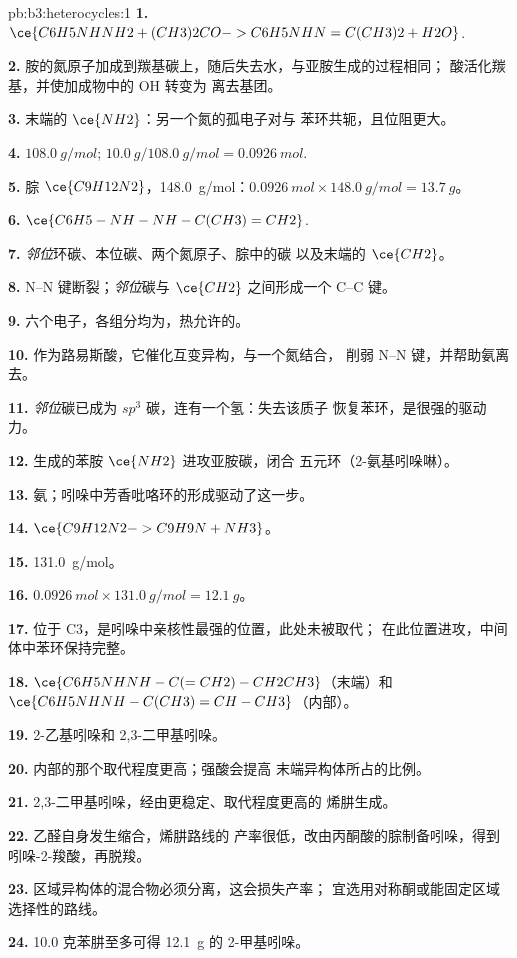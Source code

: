 \begin{solution}{pb:b3:heterocycles:1}
\textbf{1.} $\ce{C6H5NHNH2 + (CH3)2CO -> C6H5NHN=C(CH3)2 + H2O}$.

\textbf{2.} 胺的氮原子加成到羰基碳上，随后失去水，与亚胺生成的过程相同；
酸活化羰基，并使加成物中的 OH 转变为
离去基团。

\textbf{3.} 末端的 $\ce{NH2}$：另一个氮的孤电子对与
苯环共轭，且位阻更大。

\textbf{4.} $\qty{108.0}{g/mol}$; $\qty{10.0}{g}/\qty{108.0}{g/mol} = \qty{0.0926}{mol}$.

\textbf{5.} 腙 $\ce{C9H12N2}$，\qty{148.0}{g/mol}：$\qty{0.0926}{mol} \times \qty{148.0}{g/mol} = \qty{13.7}{g}$。

\textbf{6.} $\ce{C6H5-NH-NH-C(CH3)=CH2}$.

\textbf{7.} \textit{邻位}环碳、本位碳、两个氮原子、腙中的碳
以及末端的 $\ce{CH2}$。

\textbf{8.} N--N 键断裂；\textit{邻位}碳与 $\ce{CH2}$ 之间形成一个 C--C 键。

\textbf{9.} 六个电子，各组分均为，热允许的。

\textbf{10.} 作为路易斯酸，它催化互变异构，与一个氮结合，
削弱 N--N 键，并帮助氨离去。

\textbf{11.} \textit{邻位}碳已成为 $sp^3$ 碳，连有一个氢：失去该质子
恢复苯环，是很强的驱动力。

\textbf{12.} 生成的苯胺 $\ce{NH2}$ 进攻亚胺碳，闭合
五元环（2-氨基吲哚啉）。

\textbf{13.} 氨；吲哚中芳香吡咯环的形成驱动了这一步。

\textbf{14.} $\ce{C9H12N2 -> C9H9N + NH3}$。

\textbf{15.} \qty{131.0}{g/mol}。

\textbf{16.} $\qty{0.0926}{mol} \times \qty{131.0}{g/mol} = \qty{12.1}{g}$。

\textbf{17.} 位于 C3，是吲哚中亲核性最强的位置，此处未被取代；
在此位置进攻，中间体中苯环保持完整。

\textbf{18.} $\ce{C6H5NHNH-C(=CH2)-CH2CH3}$（末端）和 $\ce{C6H5NHNH-C(CH3)=CH-CH3}$（内部）。

\textbf{19.} 2-乙基吲哚和 2,3-二甲基吲哚。

\textbf{20.} 内部的那个取代程度更高；强酸会提高
末端异构体所占的比例。

\textbf{21.} 2,3-二甲基吲哚，经由更稳定、取代程度更高的
烯肼生成。

\textbf{22.} 乙醛自身发生缩合，烯肼路线的
产率很低，改由丙酮酸的腙制备吲哚，得到
吲哚-2-羧酸，再脱羧。

\textbf{23.} 区域异构体的混合物必须分离，这会损失产率；
宜选用对称酮或能固定区域选择性的路线。

\textbf{24.} 10.0 克苯肼至多可得 \qty{12.1}{g} 的 2-甲基吲哚。
\end{solution}
